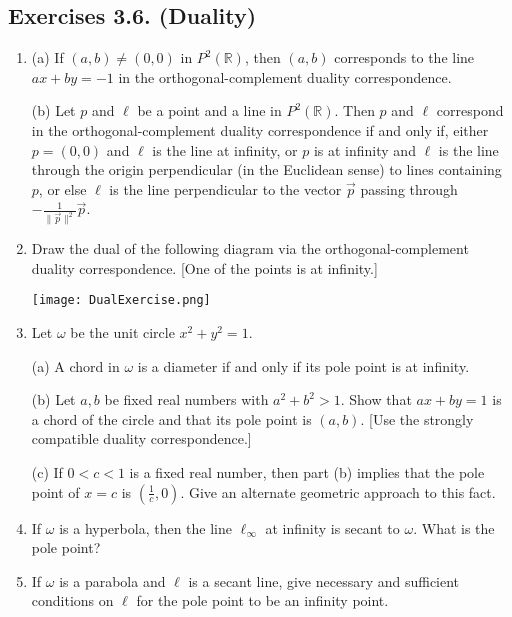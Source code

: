 \documentclass[leqno]{book}
\begin{document}
\subsection*{Exercises 3.6. (Duality)} %
\begin{enumerate}
\item (a) If $(a,b)\ne(0,0)$ in $P^2(\mathbb R)$, then $(a,b)$ corresponds to the line $ax+by=-1$ in the orthogonal-complement duality correspondence.

(b) Let $p$ and $\ell$ be a point and a line in $P^2(\mathbb R)$.  Then $p$ and $\ell$ correspond in the orthogonal-complement duality correspondence if and only if, either $p=(0,0)$ and $\ell$ is the line at infinity, or $p$ is at infinity and $\ell$ is the line through the origin perpendicular (in the Euclidean sense) to lines containing $p$, or else $\ell$ is the line perpendicular to the vector $\vec p$ passing through $-\frac 1{\|\vec p\|^2}\vec p$.

\item Draw the dual of the following diagram via the orthogonal-complement duality correspondence.  [One of the points is at infinity.]
\begin{center}
\texttt{[image: DualExercise.png]}
\end{center}
\item Let $\omega$ be the unit circle $x^2+y^2=1$.

(a) A chord in $\omega$ is a diameter if and only if its pole point is at infinity.

(b) Let $a,b$ be fixed real numbers with $a^2+b^2>1$.  Show that $ax+by=1$ is a chord of the circle and that its pole point is $(a,b)$.  [Use the strongly compatible duality correspondence.]

(c) If $0<c<1$ is a fixed real number, then part (b) implies that the pole point of $x=c$ is $(\frac 1c,0)$.  Give an alternate geometric approach to this fact.

\item If $\omega$ is a hyperbola, then the line $\ell_\infty$ at infinity is secant to $\omega$.  What is the pole point?

\item If $\omega$ is a parabola and $\ell$ is a secant line, give necessary and sufficient conditions on $\ell$ for the pole point to be an infinity point.


\end{enumerate}
\end{document}
